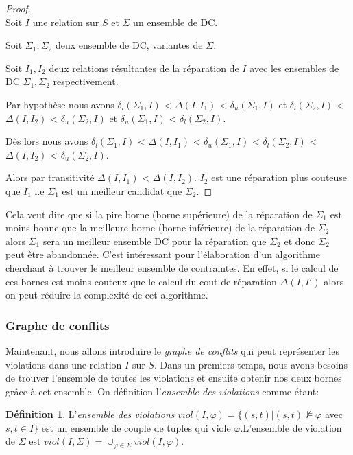 \documentclass[letterpaper, 12pt]{report}
\theoremstyle{definition}
\newtheorem{mydef}{Définition}
\begin{document}
\begin{proof}~\\
\hspace*{0.5cm} Soit $I$ une relation sur $S$ et $\Sigma$ un ensemble de DC.

Soit $\Sigma_1 , \Sigma_2$ deux ensemble de DC, variantes de $\Sigma$.

Soit $I_1 , I_2$ deux relations résultantes de la réparation de $I$ avec les ensembles de DC $\Sigma_1, \Sigma_2$ respectivement.

Par hypothèse nous avons $\delta_l(\Sigma_1,I)$ < $\Delta(I,I_1)$ < $\delta_u(\Sigma_1,I)$ et $\delta_l(\Sigma_2,I)$ < $\Delta(I,I_2)$ < $\delta_u(\Sigma_2,I)$ et $\delta_u(\Sigma_1,I)$ < $\delta_l(\Sigma_2,I)$.

Dès lors nous avons $\delta_l(\Sigma_1,I)$ < $\Delta(I,I_1)$ < $\delta_u(\Sigma_1,I)$ < $\delta_l(\Sigma_2,I)$ < $\Delta(I,I_2)$ < $\delta_u(\Sigma_2,I)$.

Alors par transitivité  $\Delta(I,I_1)$ < $\Delta(I,I_2)$. $I_2$ est une réparation plus couteuse que $I_1$ i.e $\Sigma_1$ est un meilleur candidat que $\Sigma_2$.
\end{proof}

Cela veut dire que si la pire borne (borne supérieure) de la réparation de $\Sigma_1$ est moins bonne que la meilleure borne (borne inférieure) de la réparation de $\Sigma_2$ alors $\Sigma_1$ sera un meilleur ensemble DC pour la réparation que $\Sigma_2$ et donc $\Sigma_2$ peut être abandonnée. C'est intéressant pour l'élaboration d'un algorithme cherchant à trouver le meilleur ensemble de contraintes. En effet, si le calcul de ces bornes est moins couteux que le calcul du cout de réparation $\Delta(I,I')$ alors on peut réduire la complexité de cet algorithme.


\subsubsection{Graphe de conflits}

Maintenant, nous allons introduire le \emph{graphe de conflits} qui peut représenter les violations dans une relation $I$ sur $S$. Dans un premiers temps, nous avons besoins de trouver l'ensemble de toutes les violations et ensuite obtenir nos deux bornes grâce à cet ensemble. On définition l'\emph{ensemble des violations} comme étant: \cite{main}

\begin{mydef}
 L'\emph{ensemble des violations} $viol(I,\varphi) = \{ (s,t) | (s,t) \not\models \varphi $ avec $ s,t \in I \}$ est un ensemble de couple de tuples qui viole $\varphi$.L'ensemble de violation de $\Sigma$ est $viol(I,\Sigma) = \cup_{\varphi \in \Sigma}viol(I,\varphi)$.
\end{mydef}
\end{document}

